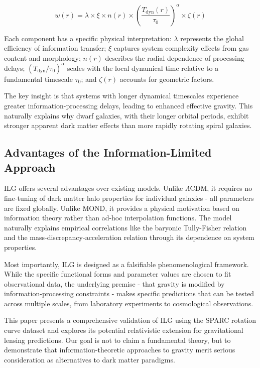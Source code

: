 \documentclass[fleqn,usenatbib]{mnras}
\begin{document}
\begin{equation}
w(r) = \lambda \times \xi \times n(r) \times \left(\frac{T_\mathrm{dyn}(r)}{\tau_0}\right)^\alpha \times \zeta(r)
\end{equation}

Each component has a specific physical interpretation: $\lambda$ represents the global efficiency of information transfer; $\xi$ captures system complexity effects from gas content and morphology; $n(r)$ describes the radial dependence of processing delays; $(T_\mathrm{dyn}/\tau_0)^\alpha$ scales with the local dynamical time relative to a fundamental timescale $\tau_0$; and $\zeta(r)$ accounts for geometric factors.

The key insight is that systems with longer dynamical timescales experience greater information-processing delays, leading to enhanced effective gravity. This naturally explains why dwarf galaxies, with their longer orbital periods, exhibit stronger apparent dark matter effects than more rapidly rotating spiral galaxies.

\subsection{Advantages of the Information-Limited Approach}

ILG offers several advantages over existing models. Unlike $\Lambda$CDM, it requires no fine-tuning of dark matter halo properties for individual galaxies - all parameters are fixed globally. Unlike MOND, it provides a physical motivation based on information theory rather than ad-hoc interpolation functions. The model naturally explains empirical correlations like the baryonic Tully-Fisher relation and the mass-discrepancy-acceleration relation through its dependence on system properties.

Most importantly, ILG is designed as a falsifiable phenomenological framework. While the specific functional forms and parameter values are chosen to fit observational data, the underlying premise - that gravity is modified by information-processing constraints - makes specific predictions that can be tested across multiple scales, from laboratory experiments to cosmological observations.

This paper presents a comprehensive validation of ILG using the SPARC rotation curve dataset and explores its potential relativistic extension for gravitational lensing predictions. Our goal is not to claim a fundamental theory, but to demonstrate that information-theoretic approaches to gravity merit serious consideration as alternatives to dark matter paradigms.
\end{document}

